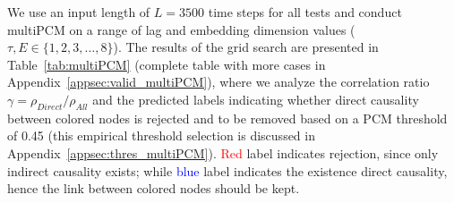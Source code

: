 We use an input length of $L = 3500$ time steps for all tests and conduct multiPCM on a range of lag and embedding dimension values ($\tau, E \in \{1, 2, 3, \ldots, 8\}$). The results of the grid search are presented in Table~\ref{tab:multiPCM} (complete table with more cases in Appendix~\ref{appsec:valid_multiPCM}), where we analyze the correlation ratio $\gamma=\rho_{Direct}/\rho_{All}$ and the predicted labels indicating whether direct causality between colored nodes is rejected and to be removed based on a PCM threshold of 0.45 (this empirical threshold selection is discussed in Appendix~\ref{appsec:thres_multiPCM}). \textcolor{red}{Red} label indicates rejection, since only indirect causality exists; while \textcolor{blue}{blue} label indicates the existence direct causality, hence the link between colored nodes should be kept.

